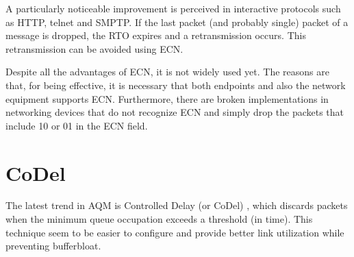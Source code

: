 A particularly noticeable improvement is perceived in interactive protocols such as HTTP, telnet and SMPTP.
If the last packet (and probably single) packet of a message is dropped, the RTO expires and a retransmission occurs.
This retransmission can be avoided using ECN.

Despite all the advantages of ECN, it is not widely used yet.
The reasons are that, for being effective, it is necessary that both endpoints and also the network equipment supports ECN.
Furthermore, there are broken implementations in networking devices that do not recognize ECN and simply drop the packets that include 10 or 01 in the ECN field.

\section{CoDel}
The latest trend in AQM is Controlled Delay (or CoDel) \cite{nichols2012cqd}, which discards packets when the minimum queue occupation exceeds a threshold (in time).
This technique seem to be easier to configure and provide better link utilization while preventing bufferbloat.
